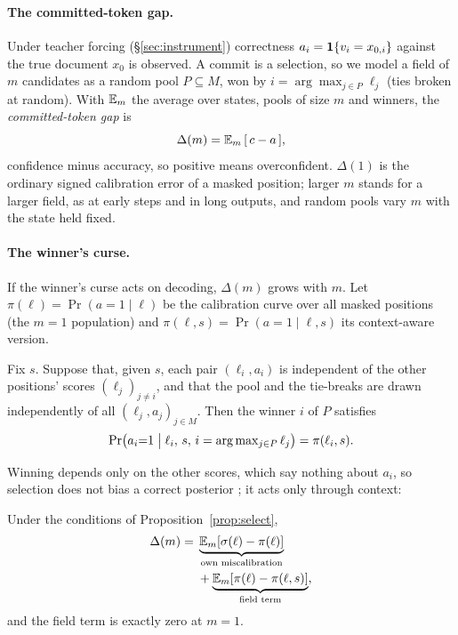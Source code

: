 \paragraph{The committed-token gap.}
Under teacher forcing (\S\ref{sec:instrument}) correctness $a_i=\mathbf{1}\{v_i=x_{0,i}\}$ against the
true document $x_0$ is observed. A commit is a selection, so we model a field of $m$ candidates
as a random pool $P\subseteq M$, won by $i=\arg\max_{j\in P}\ell_j$ (ties broken at random).
With $\mathbb{E}_m$ the average over states, pools of size $m$ and winners, the
\emph{committed-token gap} is
\begin{equation}
  \Delta(m) = \mathbb{E}_m\,[\,c - a\,],
  \label{eq:gap}
\end{equation}
confidence minus accuracy, so positive means overconfident. $\Delta(1)$ is the ordinary signed calibration error of a masked
position; larger $m$ stands for a larger field, as at early steps and in long outputs, and random pools
vary $m$ with the state held fixed.

\paragraph{The winner's curse.}
If the winner's curse \citep{efron2011tweedie,andrews2024winners} acts on decoding, $\Delta(m)$ grows with $m$. Let $\pi(\ell)=\Pr(a=1\mid\ell)$ be the calibration curve over all masked positions (the
$m=1$ population) and $\pi(\ell,s)=\Pr(a=1\mid\ell,s)$ its context-aware version.

\begin{proposition}
\label{prop:select}
Fix $s$. Suppose that, given $s$, each pair $(\ell_i,a_i)$ is independent of the other
positions' scores $(\ell_j)_{j\neq i}$, and that the pool and the tie-breaks are drawn
independently of all $(\ell_j,a_j)_{j\in M}$. Then the winner $i$ of $P$ satisfies
\[
  \Pr\bigl(a_i{=}1 \bigm| \ell_i,\, s,\, i=\arg\max\nolimits_{j\in P}\ell_j\bigr)=\pi(\ell_i,s).
\]
\end{proposition}

Winning depends only on the other scores, which say nothing about $a_i$, so selection does not
bias a correct posterior \citep{dawid1994selection,efron2011tweedie}; it acts
only through context:

\begin{proposition}
\label{prop:split}
Under the conditions of Proposition~\ref{prop:select},
\begin{equation}
  \begin{split}
  \Delta(m) = {} & \underbrace{\mathbb{E}_m[\sigma(\ell)-\pi(\ell)]}_{\text{own miscalibration}} \\
            & + \underbrace{\mathbb{E}_m[\pi(\ell)-\pi(\ell,s)]}_{\text{field term}} ,
  \end{split}
  \label{eq:gapsplit}
\end{equation}
and the field term is exactly zero at $m=1$.
\end{proposition}

